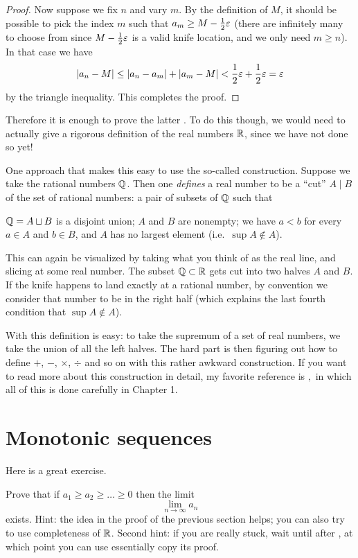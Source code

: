 \begin{proof}
	Now suppose we fix $n$ and vary $m$.
	By the definition of $M$,
	it should be possible to pick the index $m$
	such that $a_m \ge M - \frac{1}{2} \varepsilon$
	(there are infinitely many to choose from
	since $M - \frac{1}{2}\varepsilon$ is a valid knife location,
	and we only need $m \ge n$).
	In that case we have
	\[ \left\lvert a_n - M \right\rvert
		\le \left\lvert a_n - a_m \right\rvert
		+ \left\lvert a_m - M \right\rvert <
		\frac{1}{2}\varepsilon + \frac{1}{2}\varepsilon = \varepsilon \]
	by the triangle inequality.
	This completes the proof.
\end{proof}

Therefore it is enough to prove the latter .
To do this though, we would need to actually give a rigorous definition of
the real numbers $\mathbb R$, since we have not done so yet!

One approach that makes this easy to use the so-called
 construction.
Suppose we take the rational numbers $\mathbb Q$.
Then one \emph{defines} a real number to be a ``cut''
$A \mid B$ of the set of rational numbers:
a pair of subsets of $\mathbb Q$ such that
\begin{itemize}
	\ii $\mathbb Q = A \sqcup B$ is a disjoint union;
	\ii $A$ and $B$ are nonempty;
	\ii we have $a < b$ for every $a \in A$ and $b \in B$, and
	\ii $A$ has no largest element (i.e.\ $\sup A \notin A$).
\end{itemize}
This can again be visualized by taking what you think of
as the real line, and slicing at some real number.
The subset $\mathbb Q \subset \mathbb R$ gets cut into two halves $A$ and $B$.
If the knife happens to land exactly at a rational number,
by convention we consider that number to be in the right half
(which explains the last fourth condition that $\sup A \notin A$).

With this definition  is easy:
to take the supremum of a set of real numbers,
we take the union of all the left halves.
The hard part is then figuring out how to define $+$, $-$, $\times$, $\div$
and so on with this rather awkward construction.
If you want to read more about this construction in detail,
my favorite reference is \cite{ref:pugh}$,$
in which all of this is done carefully in Chapter 1.

\section{Monotonic sequences}
Here is a great exercise.
\begin{exercise}
	[Mandatory]
	\label{exer:inf_exists}
	Prove that if $a_1 \ge a_2 \ge \dots \ge 0$
	then the limit
	\[ \lim_{n \to \infty} a_n \]
	exists.
	Hint: the idea in the proof of the previous section helps;
	you can also try to use completeness of $\mathbb R$.
	Second hint: if you are really stuck,
	wait until after ,
	at which point you can use essentially copy its proof.
\end{exercise}

